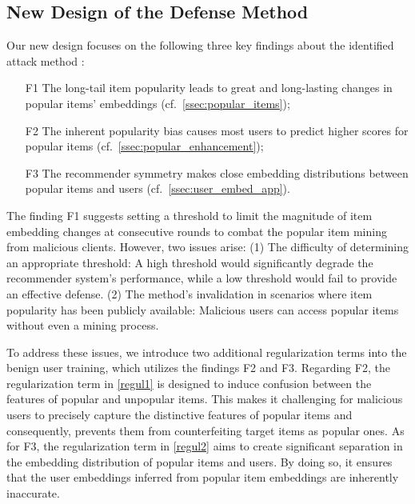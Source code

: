 \subsection{New Design of the Defense Method}
\label{ssec:defense_design}

Our new design focuses on the following three key findings about the identified attack method \model{}:
\begin{enumerate}[leftmargin=*]
\item[F1] The long-tail item popularity leads to great and long-lasting changes in popular items' embeddings (cf.\ \cref{ssec:popular_items});
\item[F2] The inherent popularity bias causes most users to predict higher scores for popular items (cf.\ \cref{ssec:popular_enhancement});
\item[F3] The recommender symmetry makes close embedding distributions between popular items and users (cf.\ \cref{ssec:user_embed_app}).
\end{enumerate}

The finding F1 suggests setting a threshold to limit the magnitude of item embedding changes at consecutive rounds to combat the popular item mining from malicious clients.
%
However, two issues arise: (1) The difficulty of determining an appropriate threshold: A high threshold would significantly degrade the recommender system's performance, while a low threshold would fail to provide an effective defense.
(2) The method's invalidation in scenarios where item popularity has been publicly available: Malicious users can access popular items without even a mining process.

To address these issues, we introduce two additional regularization terms into the benign user training, which utilizes the findings F2 and F3. 
Regarding F2, the regularization term in \cref{regul1} is designed to induce confusion between the features of popular and unpopular items. This makes it challenging for malicious users to precisely capture the distinctive features of popular items and consequently, prevents them from counterfeiting target items as popular ones.
As for F3, the regularization term in \cref{regul2} aims to create significant separation in the embedding distribution of popular items and users. By doing so, it ensures that the user embeddings inferred from popular item embeddings are inherently inaccurate.

